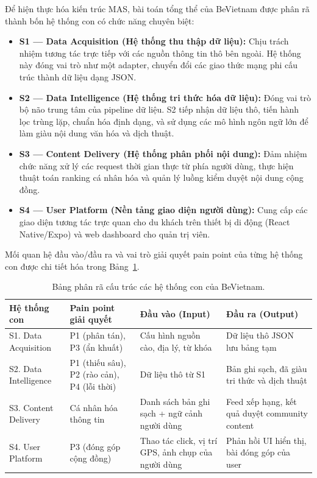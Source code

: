 Để hiện thực hóa kiến trúc MAS, bài toán tổng thể của BeVietnam được phân rã thành bốn hệ thống con có chức năng chuyên biệt:
\begin{itemize}
    \item \textbf{S1 --- Data Acquisition (Hệ thống thu thập dữ liệu):} Chịu trách nhiệm tương tác trực tiếp với các nguồn thông tin thô bên ngoài. Hệ thống này đóng vai trò như một adapter, chuyển đổi các giao thức mạng phi cấu trúc thành dữ liệu dạng JSON.
    \item \textbf{S2 --- Data Intelligence (Hệ thống tri thức hóa dữ liệu):} Đóng vai trò bộ não trung tâm của pipeline dữ liệu. S2 tiếp nhận dữ liệu thô, tiến hành lọc trùng lặp, chuẩn hóa định dạng, và sử dụng các mô hình ngôn ngữ lớn để làm giàu nội dung văn hóa và dịch thuật.
    \item \textbf{S3 --- Content Delivery (Hệ thống phân phối nội dung):} Đảm nhiệm chức năng xử lý các request thời gian thực từ phía người dùng, thực hiện thuật toán ranking cá nhân hóa và quản lý luồng kiểm duyệt nội dung cộng đồng.
    \item \textbf{S4 --- User Platform (Nền tảng giao diện người dùng):} Cung cấp các giao diện tương tác trực quan cho du khách trên thiết bị di động (React Native/Expo) và web dashboard cho quản trị viên.
\end{itemize}

Mối quan hệ đầu vào/đầu ra và vai trò giải quyết pain point của từng hệ thống con được chi tiết hóa trong Bảng~\ref{tab:subsystems_breakdown}.

\begin{table}[H]
\centering
\begin{tabularx}{\textwidth}{l p{2.8cm} X X}
\toprule
\textbf{Hệ thống con} & \textbf{Pain point giải quyết} & \textbf{Đầu vào (Input)} & \textbf{Đầu ra (Output)} \\
\midrule
S1. Data Acquisition & P1 (phân tán), P3 (ẩn khuất) & Cấu hình nguồn cào, địa lý, từ khóa & Dữ liệu thô JSON lưu bảng tạm \\
S2. Data Intelligence & P1 (thiếu sâu), P2 (rào cản), P4 (lỗi thời) & Dữ liệu thô từ S1 & Bản ghi sạch, đã giàu tri thức và dịch thuật \\
S3. Content Delivery & Cá nhân hóa thông tin & Danh sách bản ghi sạch + ngữ cảnh người dùng & Feed xếp hạng, kết quả duyệt community content \\
S4. User Platform & P3 (đóng góp cộng đồng) & Thao tác click, vị trí GPS, ảnh chụp của người dùng & Phản hồi UI hiển thị, bài đóng góp của user \\
\bottomrule
\end{tabularx}
\caption{Bảng phân rã cấu trúc các hệ thống con của BeVietnam.}
\label{tab:subsystems_breakdown}
\end{table}

